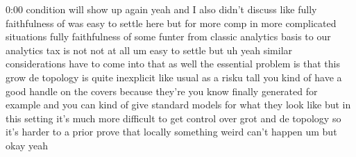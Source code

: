 \begin{unfinished}{0:00}
condition  will  show  up
again
yeah  and  I  also  didn't  discuss  like
fully  faithfulness
of  was  easy  to  settle  here  but  for  more
comp  in  more  complicated  situations
fully  faithfulness  of  some  funter  from
classic  analytics  basis  to  our  analytics
tax  is  not  not  at  all  um  easy  to  settle
but  uh  yeah  similar  considerations  have
to  come  into  that  as
well  the  essential  problem  is  that  this
grow  de  topology  is  quite  inexplicit
like  usual  as  a  risku  tall  you  kind  of
have  a  good  handle  on  the  covers  because
they're  you  know  finally  generated  for
example  and  you  can  kind
of  give  standard  models  for  what  they
look  like  but  in  this  setting  it's  much
more  difficult  to  get  control  over  grot
and  de  topology  so  it's  harder  to  a
prior  prove  that  locally  something  weird
can't  happen  um  but  okay
yeah
\end{unfinished}